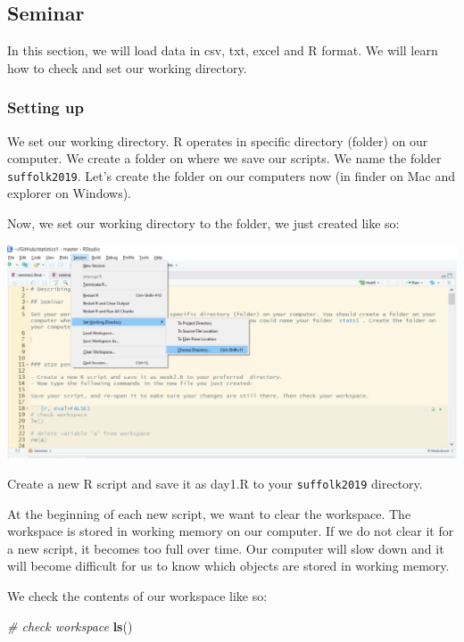\documentclass[]{article}
\newenvironment{Shaded}{\begin{snugshade}}{\end{snugshade}}
\newcommand{\CommentTok}[1]{\textcolor[rgb]{0.56,0.35,0.01}{\textit{#1}}}
\newcommand{\KeywordTok}[1]{\textcolor[rgb]{0.13,0.29,0.53}{\textbf{#1}}}
\newcommand{\NormalTok}[1]{#1}
\begin{document}
\hypertarget{seminar-1}{%
\subsection{Seminar}\label{seminar-1}}

In this section, we will load data in csv, txt, excel and R format. We will learn how to check and set our working directory.

\hypertarget{setting-up}{%
\subsubsection{Setting up}\label{setting-up}}

We set our working directory. R operates in specific directory (folder) on our computer. We create a folder on where we save our scripts. We name the folder \texttt{suffolk2019}. Let's create the folder on our computers now (in finder on Mac and explorer on Windows).

Now, we set our working directory to the folder, we just created like so:

\includegraphics{./img/setwdir.png}

Create a new R script and save it as day1.R to your \texttt{suffolk2019} directory.

At the beginning of each new script, we want to clear the workspace. The workspace is stored in working memory on our computer. If we do not clear it for a new script, it becomes too full over time. Our computer will slow down and it will become difficult for us to know which objects are stored in working memory.

We check the contents of our workspace like so:

\begin{Shaded}
\begin{Highlighting}[]
\CommentTok{# check workspace}
\KeywordTok{ls}\NormalTok{()}
\end{Highlighting}
\end{Shaded}
\end{document}
